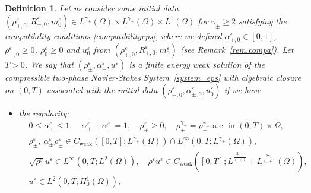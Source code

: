 \documentclass[11pt, twoside, a4paper]{article}
\theoremstyle{plain}
\newtheorem{definition}[theorem]{Definition}
\theoremstyle{remark}
\numberwithin{equation}{section}
\renewcommand{\leq}{\leqslant}\renewcommand{\le}{\leqslant}
\renewcommand{\geq}{\geqslant}\renewcommand{\ge}{\geqslant}
\renewcommand{\epsilon}{\varepsilon}
\newcommand{\eps}{\varepsilon}
\newcommand{\ap}{\alpha_+}
\newcommand{\am}{\alpha_-}
\begin{document}
\begin{definition}\label{defp}
Let us consider some initial data $(\rho_{+,0}^\eps,R_{+,0}^\eps, m_0^\epsilon)\in L^{\gamma_+}(\Omega)\times L^{\gamma_+}(\Omega)\times L^{1}(\Omega)$ for $\gamma_\pm \geq 2$ satisfying the compatibility conditions \eqref{compatibilityeps}, where we defined $\alpha_{\pm,0}^\eps\in [0,1]$, $\rho_{-,0}^\eps\geq 0$, $\rho^\eps_0\geq 0$ and $u_0^\eps$ from $(\rho_{+,0}^\eps,R_{+,0}^\eps, m_0^\epsilon)$ (see Remark~\ref{rem.compa}). Let $T>0$. We say that $(\rho_\pm^\eps,\alpha_\pm^\eps,u^\eps)$ is a finite energy weak solution of the compressible two-phase Navier-Stokes System~\eqref{system_eps} with algebraic closure on $(0,T)$ associated with the initial data $(\rho_{\pm,0}^\eps, \alpha_{\pm,0}^\eps, u_0^\eps)$ if we have
 \begin{itemize}
 \item the regularity:
 \begin{align*}
 &0 \leq \alpha_+^\eps \leq 1, \quad \ap^\eps + \am^\eps = 1, \quad \rho_\pm^\eps \geq 0, \quad \rho_+^{\gamma_+}=\rho_-^{\gamma_-} \text{ a.e. in } (0,T)\times \Omega,\\
 &\rho_\pm^\eps ,\ \alpha_\pm^\eps \rho_\pm^\eps\in C_{\text{weak}}([0,T]; L^{\gamma_\pm}(\Omega))\cap L^\infty(0,T; L^{\gamma_\pm}(\Omega)),\\
 &\sqrt{\rho^\eps} u^\eps \in L^\infty(0,T; L^{2}(\Omega)), \quad
 \rho^\eps u^\eps \in C_{\text{weak}}([0,T]; L^{\frac{2 \gamma_+}{\gamma_++1}}+L^{\frac{2 \gamma_-}{\gamma_-+1}}(\Omega)),\\
 & u^\eps\in L^2(0,T;H^1_0(\Omega)),
 \end{align*}
 

\end{itemize}
\end{definition}
\end{document}
